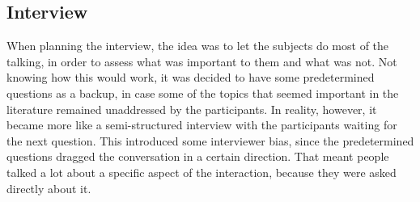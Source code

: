 \subsection{Interview}
When planning the interview, the idea was to let the subjects do most of the talking, in order to assess what was important to them and what was not. Not knowing how this would work, it was decided to have some predetermined questions as a backup, in case some of the topics that seemed important in the literature remained unaddressed by the participants. In reality, however, it became more like a semi-structured interview with the participants waiting for the next question. This introduced some interviewer bias, since the predetermined questions dragged the conversation in a certain direction. That meant people talked a lot about a specific aspect of the interaction, because they were asked directly about it.